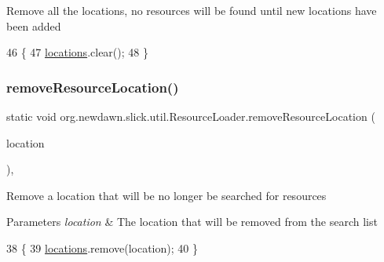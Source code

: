 Remove all the locations, no resources will be found until new locations have been added 
\begin{DoxyCode}
46                                                     \{
47         \mbox{\hyperlink{classorg_1_1newdawn_1_1slick_1_1util_1_1_resource_loader_a28036dde216244ec1fb50577d136eac3}{locations}}.clear();
48     \}
\end{DoxyCode}
\mbox{\label{classorg_1_1newdawn_1_1slick_1_1util_1_1_resource_loader_a07baccb0f4cbd257770ca4d106deef29}} 
\subsubsection{\texorpdfstring{remove\+Resource\+Location()}{removeResourceLocation()}}
{\footnotesize\ttfamily static void org.\+newdawn.\+slick.\+util.\+Resource\+Loader.\+remove\+Resource\+Location (\begin{DoxyParamCaption}\item[{\mbox{\hyperlink{interfaceorg_1_1newdawn_1_1slick_1_1util_1_1_resource_location}{Resource\+Location}}}]{location }\end{DoxyParamCaption})\hspace{0.3cm}{\ttfamily [inline]}, {\ttfamily [static]}}

Remove a location that will be no longer be searched for resources


\begin{DoxyParams}{Parameters}
{\em location} & The location that will be removed from the search list \\
\hline
\end{DoxyParams}

\begin{DoxyCode}
38                                                                          \{
39         \mbox{\hyperlink{classorg_1_1newdawn_1_1slick_1_1util_1_1_resource_loader_a28036dde216244ec1fb50577d136eac3}{locations}}.remove(location);
40     \}
\end{DoxyCode}
\mbox{\label{classorg_1_1newdawn_1_1slick_1_1util_1_1_resource_loader_a606918828f55d8ed9c16ead437b719fb}} 
